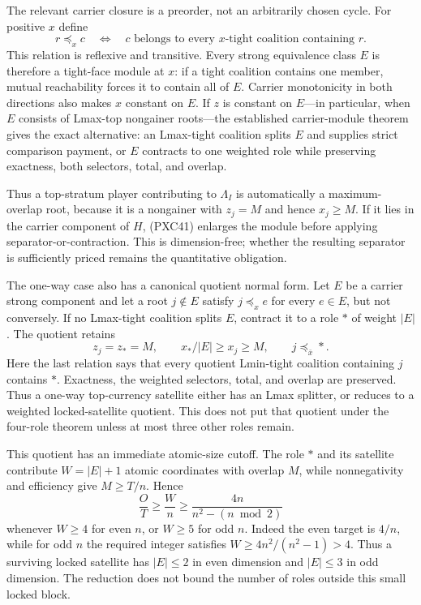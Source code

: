 \documentclass[11pt]{article}
\begin{document}
The relevant carrier closure is a preorder, not an arbitrarily chosen cycle.
For positive $x$ define
\[
 r\preceq_x c
 \quad\Longleftrightarrow\quad
 c\text{ belongs to every $x$-tight coalition containing }r. \tag{PXC41}
\]
This relation is reflexive and transitive.  Every strong equivalence class
$E$ is therefore a tight-face module at $x$: if a tight coalition contains
one member, mutual reachability forces it to contain all of $E$.  Carrier
monotonicity in both directions also makes $x$ constant on $E$.  If $z$ is
constant on $E$---in particular, when $E$ consists of Lmax-top nongainer
roots---the established carrier-module theorem gives the exact alternative:
an Lmax-tight coalition splits $E$ and supplies strict comparison payment,
or $E$ contracts to one weighted role while preserving exactness, both
selectors, total, and overlap.

Thus a top-stratum player contributing to $\Lambda_I$ is automatically a
maximum-overlap root, because it is a nongainer with $z_j=M$ and hence
$x_j\ge M$.  If it lies in the carrier component of $H$, (PXC41) enlarges the
module before applying separator-or-contraction.  This is dimension-free;
whether the resulting separator is sufficiently priced remains the
quantitative obligation.

The one-way case also has a canonical quotient normal form.  Let $E$ be a
carrier strong component and let a root $j\notin E$ satisfy
$j\preceq_x e$ for every $e\in E$, but not conversely.  If no Lmax-tight
coalition splits $E$, contract it to a role $*$ of weight $|E|$.  The quotient
retains
\[
 z_j=z_*=M,\qquad x_*/|E|\ge x_j\ge M,\qquad
 j\preceq_{\bar x} *.                                  \tag{PXC42}
\]
Here the last relation says that every quotient Lmin-tight coalition
containing $j$ contains $*$.  Exactness, the weighted selectors, total, and
overlap are preserved.  Thus a one-way top-currency satellite either has an
Lmax splitter, or reduces to a weighted locked-satellite quotient.  This
does not put that quotient under the four-role theorem unless at most three
other roles remain.

This quotient has an immediate atomic-size cutoff.  The role $*$ and its
satellite contribute $W=|E|+1$ atomic coordinates with overlap $M$, while
nonnegativity and efficiency give $M\ge T/n$.  Hence
\[
 \frac OT\ge\frac Wn\ge
 \frac{4n}{n^2-(n\bmod2)}                            \tag{PXC43}
\]
whenever $W\ge4$ for even $n$, or $W\ge5$ for odd $n$.  Indeed the even
target is $4/n$, while for odd $n$ the required integer satisfies
$W\ge4n^2/(n^2-1)>4$.  Thus a surviving locked satellite has
$|E|\le2$ in even dimension and $|E|\le3$ in odd dimension.  The reduction
does not bound the number of roles outside this small locked block.
\end{document}
